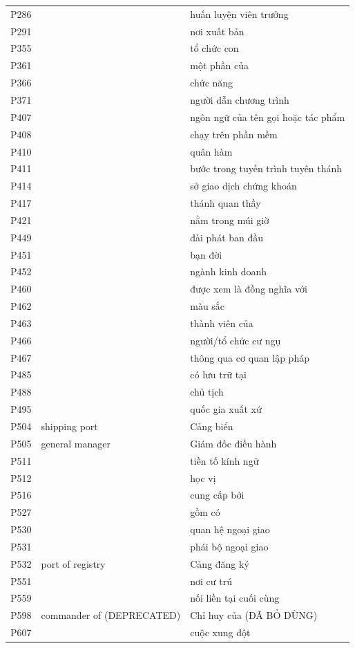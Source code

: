 \begin{center}
\begin{longtable}{p{1.6cm} p{5.2cm} p{5.2cm}}
P286 &  & huấn luyện viên trưởng \\
P291 &  & nơi xuất bản \\
P355 &  & tổ chức con \\
P361 &  & một phần của \\
P366 &  & chức năng \\
P371 &  & người dẫn chương trình \\
P407 &  & ngôn ngữ của tên gọi hoặc tác phẩm \\
P408 &  & chạy trên phần mềm \\
P410 &  & quân hàm \\
P411 &  & bước trong tuyến trình tuyên thánh \\
P414 &  & sở giao dịch chứng khoán \\
P417 &  & thánh quan thầy \\
P421 &  & nằm trong múi giờ \\
P449 &  & đài phát ban đầu \\
P451 &  & bạn đời \\
P452 &  & ngành kinh doanh \\
P460 &  & được xem là đồng nghĩa với \\
P462 &  & màu sắc \\
P463 &  & thành viên của \\
P466 &  & người/tổ chức cư ngụ \\
P467 &  & thông qua cơ quan lập pháp \\
P485 &  & có lưu trữ tại \\
P488 &  & chủ tịch \\
P495 &  & quốc gia xuất xứ \\
P504 & shipping port & Cảng biển \\
P505 & general manager & Giám đốc điều hành \\
P511 &  & tiền tố kính ngữ \\
P512 &  & học vị \\
P516 &  & cung cấp bởi \\
P527 &  & gồm có \\
P530 &  & quan hệ ngoại giao \\
P531 &  & phái bộ ngoại giao \\
P532 & port of registry & Cảng đăng ký \\
P551 &  & nơi cư trú \\
P559 &  & nối liền tại cuối cùng \\
P598 & commander of (DEPRECATED) & Chỉ huy của (ĐÃ BỎ DÙNG) \\
P607 &  & cuộc xung đột \\

\end{longtable}
\end{center}
